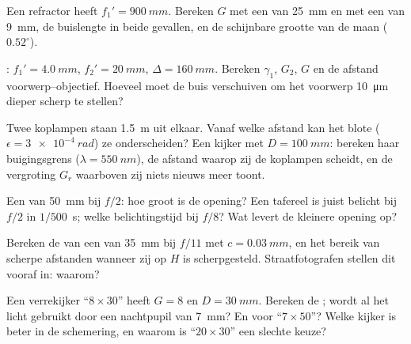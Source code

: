 \begin{exercise}[$\star$]\label{exo:b1:optical-instruments:4}
Een refractor heeft $f_1' = \qty{900}{mm}$. Bereken $G$ met een  van
\qty{25}{mm} en met een van \qty{9}{mm}, de buislengte in beide gevallen, en de
schijnbare grootte van de maan ($0.52^\circ$).
\end{exercise}

\begin{exercise}[$\star\star$]\label{exo:b1:optical-instruments:5}
: $f_1' = \qty{4.0}{mm}$, $f_2' = \qty{20}{mm}$,
$\Delta = \qty{160}{mm}$. Bereken $\gamma_1$, $G_2$, $G$ en de afstand
voorwerp--objectief. Hoeveel moet de buis verschuiven om het voorwerp
\qty{10}{\micro m} dieper scherp te stellen?
\end{exercise}

\begin{exercise}[$\star\star$]\label{exo:b1:optical-instruments:6}
Twee koplampen staan \qty{1.5}{m} uit elkaar. Vanaf welke afstand kan het
blote  ($\epsilon = \qty{3e-4}{rad}$) ze onderscheiden? Een kijker
met $D = \qty{100}{mm}$: bereken haar buigingsgrens ($\lambda =
\qty{550}{nm}$), de afstand waarop zij de koplampen scheidt, en de
vergroting $G_r$ waarboven zij niets nieuws meer toont.
\end{exercise}

\begin{exercise}[$\star\star$]\label{exo:b1:optical-instruments:7}
Een  van \qty{50}{mm} bij $f/2$: hoe groot is de opening? Een tafereel is
juist belicht bij $f/2$ in $1/500$~\unit{s}; welke belichtingstijd bij
$f/8$? Wat levert de kleinere opening op?
\end{exercise}

\begin{exercise}[$\star\star$]\label{exo:b1:optical-instruments:8}
Bereken de  van een  van \qty{35}{mm} bij $f/11$ met
$c = \qty{0.03}{mm}$, en het bereik van scherpe afstanden wanneer zij op $H$
is scherpgesteld. Straatfotografen stellen dit vooraf in: waarom?
\end{exercise}

\begin{exercise}[$\star\star$]\label{exo:b1:optical-instruments:9}
Een verrekijker ``$8\times30$'' heeft $G = 8$ en $D = \qty{30}{mm}$. Bereken
de ; wordt al het licht gebruikt door een nachtpupil van
\qty{7}{mm}? En voor ``$7\times50$''? Welke kijker is beter in de schemering, en
waarom is ``$20\times30$'' een slechte keuze?
\end{exercise}

